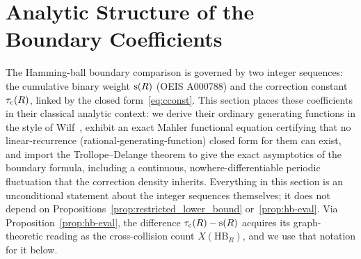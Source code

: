 
\section{Analytic Structure of the Boundary Coefficients}\label{sec:analytic}

The Hamming-ball boundary comparison is governed by two integer sequences:
the cumulative binary weight $\mathrm{s}(R)$ (OEIS A000788) and the correction
constant $\tau_{\mathrm{c}}(R)$, linked by the closed form~\eqref{eq:cconst}. This
section places these coefficients in their
classical analytic context: we derive their ordinary generating functions in
the style of Wilf~\cite{wilf2006generatingfunctionology}, exhibit an exact
Mahler functional equation certifying that no linear-recurrence
(rational-generating-function) closed form for them can exist, and import the
Trollope--Delange theorem to give the exact asymptotics of the boundary
formula, including a continuous, nowhere-differentiable periodic fluctuation
that the correction density inherits. Everything in this section is an
unconditional statement about the integer sequences themselves; it does not
depend on Propositions~\ref{prop:restricted_lower_bound} or~\ref{prop:hb-eval}. Via
Proposition~\ref{prop:hb-eval}, the difference $\tau_{\mathrm{c}}(R) - \mathrm{s}(R)$ acquires
its graph-theoretic reading as the cross-collision count $X(\mathrm{HB}_R)$,
and we use that notation for it below.


